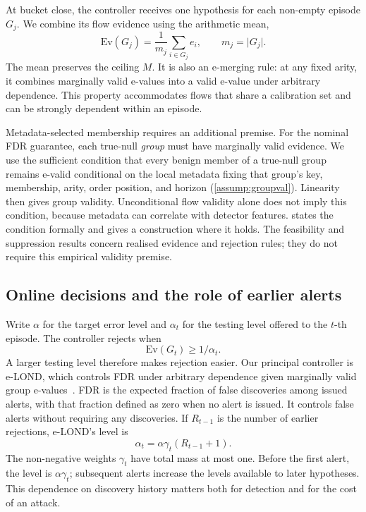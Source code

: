 \documentclass[conference]{IEEEtran}
\newcommand{\ceil}{M}
\newcommand{\alphat}{\alpha_t}
\newcommand{\Ev}{\mathrm{Ev}}
\begin{document}
At bucket close, the controller receives one hypothesis for each non-empty episode $G_j$. We combine
its flow evidence using the arithmetic mean,
\begin{equation}\label{eq:mean}
\Ev(G_j)=\frac1{m_j}\sum_{i\in G_j}e_i,\qquad m_j=\lvert G_j\rvert.
\end{equation}
The mean preserves the ceiling $\ceil$. It is also an e-merging rule: at any fixed arity, it combines
marginally valid e-values into a valid e-value under arbitrary dependence. This property accommodates
flows that share a calibration set and can be strongly dependent within an episode.

Metadata-selected membership requires an additional premise. For the nominal FDR guarantee, each
true-null \emph{group} must have marginally valid evidence. We use the sufficient condition that every
benign member of a true-null group remains e-valid conditional on the local metadata fixing that
group's key, membership, arity, order position, and horizon (\cref{assump:groupval}). Linearity then
gives group validity. Unconditional flow validity alone does not imply this condition, because
metadata can correlate with detector features.  states the condition formally and
gives a construction where it holds. The feasibility and suppression results concern realised
evidence and rejection rules; they do not require this empirical validity premise.

\subsection{Online decisions and the role of earlier alerts}\label{sec:decisions}

Write $\alpha$ for the target error level and $\alphat$ for the testing level offered to the $t$-th
episode. The controller rejects when
\begin{equation}\label{eq:reject}
\Ev(G_t)\ge1/\alphat.
\end{equation}
A larger testing level therefore makes rejection easier. Our principal controller is e-LOND, which
controls FDR under arbitrary dependence given marginally valid group
e-values~\cite{xu2024elond}. FDR is the expected fraction of false discoveries among issued alerts,
with that fraction defined as zero when no alert is issued. It controls false alerts without
requiring any discoveries. If $R_{t-1}$ is the number of earlier rejections, e-LOND's level is
\begin{equation}\label{eq:elond}
\alphat=\alpha\gamma_t(R_{t-1}+1).
\end{equation}
The non-negative weights $\gamma_t$ have total mass at most one. Before the first alert, the level is
$\alpha\gamma_t$; subsequent alerts increase the levels available to later hypotheses. This dependence
on discovery history matters both for detection and for the cost of an attack.
\end{document}
